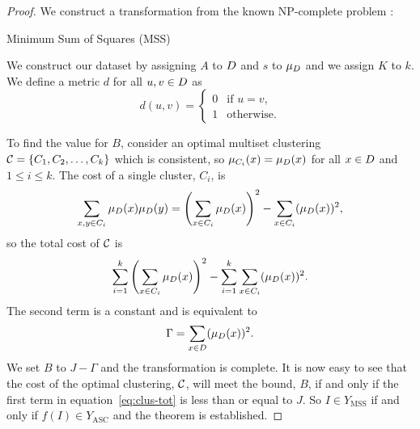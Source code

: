 \begin{proof}
  We construct a transformation from the known NP-complete problem
  \citep{gareyjohnson79}:
  \begin{problem}{Minimum Sum of Squares (MSS)}
  \end{problem}
  We construct our dataset by assigning $A$ to $D$ and $s$ to
  $\mu_{D}$ and we assign $K$ to $k$.  We define a metric $d$ for all $u,v
  \in D$ as
  \begin{equation*}
    d(u,v) =
    \begin{cases}
      0 & \text{if $u=v$,}\\
      1 & \text{otherwise.}
    \end{cases}
  \end{equation*}

  To find the value for $B$, consider an optimal multiset clustering
  $\mathcal{C}=\{C_1,C_2,\dotsc,C_k\}$ which is consistent, so
  $\mu_{C_i}(x)=\mu_{D}(x)$ for all $x \in D$ and $1 \leq i \leq k$.
  The cost of a single cluster, $C_i$, is
  \begin{equation*}
    \sum_{x,y \in C_i} \mu_{D}(x)\mu_{D}(y)
    = \left(\sum_{x \in C_i} \mu_{D}(x)\right)^2
    - \sum_{x \in C_i} (\mu_{D}(x))^2,
  \end{equation*}
  so the total cost of $\mathcal{C}$ is
  \begin{equation}
    \label{eq:clus-tot}
    \sum_{i=1}^{k}\left(\sum_{x \in C_i} \mu_{D}(x)\right)^2
    - \sum_{i=1}^{k}\sum_{x \in C_i} (\mu_{D}(x))^2.
  \end{equation}
  The second term is a constant and is equivalent to
  \begin{equation*}
    \Gamma = \sum_{x \in D} (\mu_{D}(x))^2.
  \end{equation*}
  We set $B$ to $J-\Gamma$ and the transformation is complete.  It is now easy
  to see that the cost of the optimal clustering, $\mathcal{C}$, will meet the
  bound, $B$, if and only if the first term in equation~\eqref{eq:clus-tot} is
  less than or equal to $J$.  So $I \in Y_{\text{MSS}}$ if and only if $f(I)
  \in Y_{\text{ASC}}$ and the theorem is established.
\end{proof}

